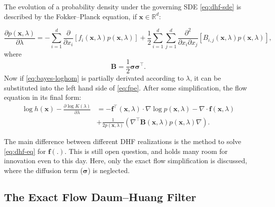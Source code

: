 The evolution of a probability density under the governing SDE \eqref{eq:dhf-sde} is described by the Fokker--Planck equation, if $\mathbf{x} \in \mathbb{R}^d$:

\begin{equation}\label{eq:fpe}
    \frac{\partial p(\mathbf{x},\lambda)}{\partial \lambda} = -\sum_{i = 1}^{d}\frac{\partial}{\partial x_i}\left[f_i(\mathbf{x},\lambda)p(\mathbf{x},\lambda)\right] + \frac{1}{2}\sum_{i = 1}^{d}\sum_{j = 1}^{d}\frac{\partial^2}{\partial x_i \partial x_j}\left[B_{i,j}(\mathbf{x},\lambda)p(\mathbf{x},\lambda)\right],
\end{equation}
where
\begin{equation}\label{key}
    \mathbf{B} = \frac{1}{2}\boldsymbol\sigma\boldsymbol\sigma^\top.
\end{equation}
Now if \eqref{eq:bayes-loghom} is partially derivated according to $\lambda$, it can be substituted into the left hand side of \eqref{eq:fpe}. After some simplification, the flow equation in its final form:
\begin{align}\label{eq:dhf-eq}
    \log h(\mathbf{x}) - \frac{\partial \log K(\lambda)}{\partial \lambda} & = -\mathbf{f}^\top(\mathbf{x},\lambda)\cdot\nabla\log p(\mathbf{x},\lambda) - \nabla\cdot \mathbf{f}(\mathbf{x},\lambda)       \\
                                                                           & + \frac{1}{2p(\mathbf{x},\lambda)}\left(\nabla^\top\mathbf{B}(\mathbf{x},\lambda)p(\mathbf{x},\lambda)\nabla\right). \nonumber
\end{align}

The main difference between different DHF realizations is the method to solve \eqref{eq:dhf-eq} for $\mathbf{f}(.)$. This is still open question, and holds many room for innovation even to this day.  Here, only the exact flow simplification \cite{Daum2010} is discussed, where the diffusion term ($\boldsymbol\sigma$) is neglected.

\subsection{The Exact Flow Daum--Huang Filter}

